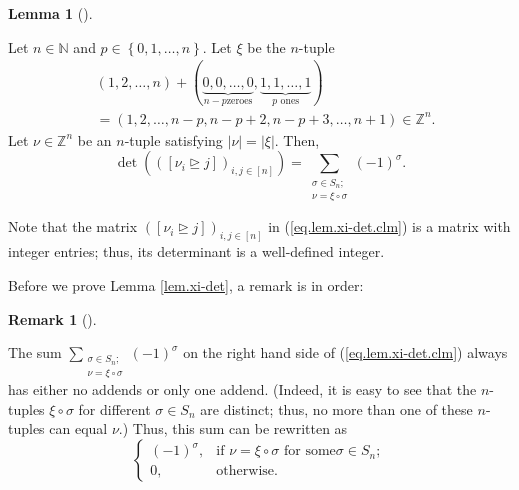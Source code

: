 \documentclass
[numbers=enddot,12pt,final,onecolumn,notitlepage,english]{scrartcl}%
\theoremstyle{definition}
\newtheorem{lem}[theo]{Lemma}
\newenvironment{lemma}[1][]
{\begin{lem}[#1]\begin{leftbar}}
{\end{leftbar}\end{lem}}
\newtheorem{remk}[theo]{Remark}
\newenvironment{remark}[1][]
{\begin{remk}[#1]\begin{leftbar}}
{\end{leftbar}\end{remk}}
\let\sumnonlimits\sum
\renewcommand{\sum}{\sumnonlimits\limits}
\begin{document}
\begin{lemma}
\label{lem.xi-det}Let $n\in\mathbb{N}$ and $p\in\left\{  0,1,\ldots,n\right\}
$. Let $\xi$ be the $n$-tuple
\begin{align*}
&  \left(  1,2,\ldots,n\right)  +\left(  \underbrace{0,0,\ldots,0}_{n-p\text{
zeroes}},\underbrace{1,1,\ldots,1}_{p\text{ ones}}\right) \\
&  =\left(  1,2,\ldots,n-p,n-p+2,n-p+3,\ldots,n+1\right)  \in\mathbb{Z}^{n}.
\end{align*}
Let $\nu\in\mathbb{Z}^{n}$ be an $n$-tuple satisfying $\left\vert
\nu\right\vert =\left\vert \xi\right\vert $. Then,
\begin{equation}
\det\left(  \left(  \left[  \nu_{i}\trianglerighteq j\right]  \right)
_{i,j\in\left[  n\right]  }\right)  =\sum_{\substack{\sigma\in S_{n};\\\nu
=\xi\circ\sigma}}\left(  -1\right)  ^{\sigma}. \label{eq.lem.xi-det.clm}%
\end{equation}

\end{lemma}

Note that the matrix $\left(  \left[  \nu_{i}\trianglerighteq j\right]
\right)  _{i,j\in\left[  n\right]  }$ in (\ref{eq.lem.xi-det.clm}) is a matrix
with integer entries; thus, its determinant is a well-defined integer.

Before we prove Lemma \ref{lem.xi-det}, a remark is in order:

\begin{remark}
The sum $\sum_{\substack{\sigma\in S_{n};\\\nu=\xi\circ\sigma}}\left(
-1\right)  ^{\sigma}$ on the right hand side of (\ref{eq.lem.xi-det.clm})
always has either no addends or only one addend. (Indeed, it is easy to see
that the $n$-tuples $\xi\circ\sigma$ for different $\sigma\in S_{n}$ are
distinct; thus, no more than one of these $n$-tuples can equal $\nu$.) Thus,
this sum can be rewritten as
\[%
\begin{cases}
\left(  -1\right)  ^{\sigma}, & \text{if }\nu=\xi\circ\sigma\text{ for some
}\sigma\in S_{n};\\
0, & \text{otherwise.}%
\end{cases}
\]

\end{remark}
\end{document}
